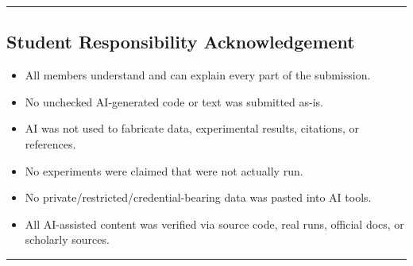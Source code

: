 \noindent\rule{\linewidth}{0.4pt}

\subsection*{Student Responsibility Acknowledgement}

\begin{itemize}
    \item[$\boxtimes$] All members understand and can explain every part of the submission.
    \item[$\boxtimes$] No unchecked AI-generated code or text was submitted as-is.
    \item[$\boxtimes$] AI was not used to fabricate data, experimental results, citations, or references.
    \item[$\boxtimes$] No experiments were claimed that were not actually run.
    \item[$\boxtimes$] No private/restricted/credential-bearing data was pasted into AI tools.
    \item[$\boxtimes$] All AI-assisted content was verified via source code, real runs, official docs, or scholarly sources.
\end{itemize}

\noindent\rule{\linewidth}{0.4pt}
